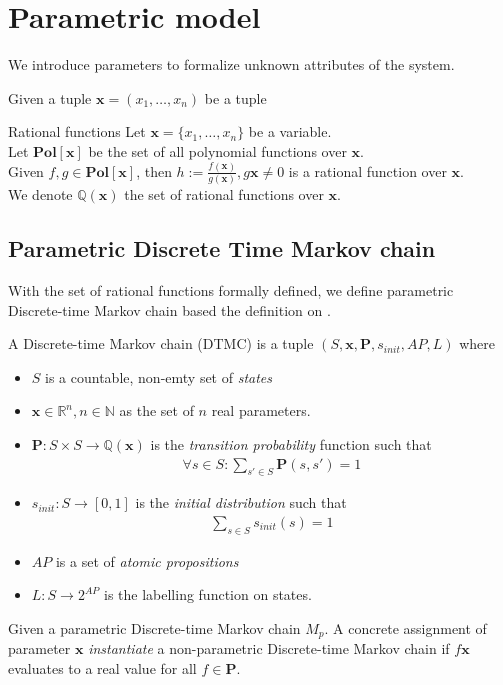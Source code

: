 \section{Parametric model}
We introduce parameters to formalize unknown attributes of the system.
\begin{definition}
    Given a tuple $\mathbf{x}=(x_1,\ldots,x_n)$ be a tuple
\end{definition}

\begin{definition}{Rational functions}
    Let $\mathbf{x}=\{x_1,\ldots,x_n\}$ be a variable.\\
    Let $\mathbf{Pol}[\mathbf{x}]$ be the set of all polynomial functions over $\mathbf{x}$.\\
    Given $f,g\in\mathbf{Pol}[\mathbf{x}]$, then $h:=\frac{f(\mathbf{x})}{g(\mathbf{x})}, g{\mathbf{x}}\neq 0$ is a rational function over $\mathbf{x}$.\\
    We denote $\mathbb{Q}(\mathbf{x})$ the set of rational functions over $\mathbf{x}$.
\end{definition}


\subsection{Parametric Discrete Time Markov chain}
With the set of rational functions formally defined, we define parametric Discrete-time Markov chain based the definition on \cite{junges2019parameter}.
\begin{definition}
    A Discrete-time Markov chain (DTMC) is a tuple $(S, \mathbf{x}, \mathbf{P}, s_{init}, AP, L)$ where
    \begin{itemize}
        \item $S$ is a countable, non-emty set of \textit{states}
        \item $\mathbf{x} \in \mathbb{R}^n, n \in \mathbb{N}$ as the set of $n$ real parameters.
        \item $\mathbf{P}:S\times S \rightarrow \mathbb{Q}(\mathbf{x})$ is the \textit{transition probability}
              function such that
              \begin{align*}
                  \forall s \in S : \sum_{s'\in S}\mathbf{P}(s, s') = 1
              \end{align*}
        \item $s_{init}: S \rightarrow [0,1]$ is the \textit{initial distribution} such that
              \begin{align*}
                  \sum_{s\in S}s_{init}(s) = 1
              \end{align*}
        \item $AP$ is a set of \textit{atomic propositions}
        \item $L: S \rightarrow 2^{AP}$ is the labelling function on states.
    \end{itemize}
\end{definition}

Given a parametric Discrete-time Markov chain $M_p$. A concrete assignment of parameter $\mathbf{x}$ \textit{instantiate} a non-parametric Discrete-time Markov chain if $f{\mathbf{x}}$ evaluates to a real value for all $f\in\mathbf{P}$.